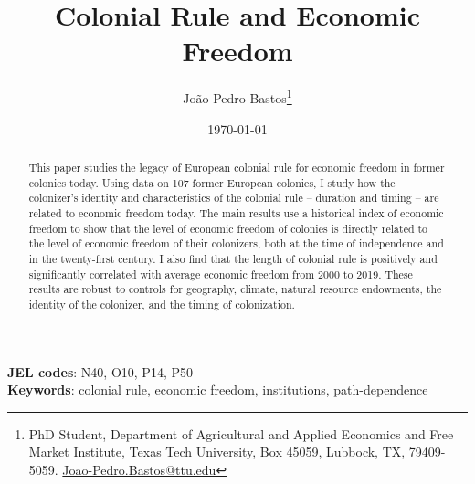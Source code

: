 \documentclass[a4paper,12pt]{article}
\title{Colonial Rule and Economic Freedom
       \bigskip}
\author{Jo\~{a}o Pedro Bastos\thanks{PhD Student, Department of Agricultural and Applied Economics and Free Market Institute, Texas Tech University, Box 45059, Lubbock, TX, 79409-5059. \url{Joao-Pedro.Bastos@ttu.edu}}}
\date{\today}
\begin{document}

\maketitle

\begin{abstract}
\noindent This paper studies the legacy of European colonial rule for economic freedom in former colonies today. Using data on 107 former European colonies, I study how the colonizer's identity and characteristics of the colonial rule -- duration and timing -- are related to economic freedom today. The main results use a historical index of economic freedom to show that the level of economic freedom of colonies is directly related to the level of economic freedom of their colonizers, both at the time of independence and in the twenty-first century. I also find that the length of colonial rule is positively and significantly correlated with average economic freedom from 2000 to 2019. These results are robust to controls for geography, climate, natural resource endowments, the identity of the colonizer, and the timing of colonization.
\end{abstract}

\bigskip \bigskip
\begin{footnotesize}
\noindent \textbf{JEL codes}: N40, O10, P14, P50 \\
\noindent \textbf{Keywords}: colonial rule, economic freedom, institutions, path-dependence
\end{footnotesize}
\end{document}
